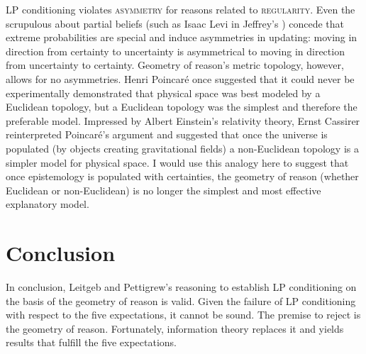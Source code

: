 \documentclass[11pt]{article}
\begin{document}
LP conditioning violates \textsc{asymmetry} for reasons related to
\textsc{regularity}. Even the scrupulous about partial beliefs (such
as Isaac Levi in Jeffrey's ) concede that extreme probabilities are special
and induce asymmetries in updating: moving in direction from certainty
to uncertainty is asymmetrical to moving in direction from uncertainty
to certainty. Geometry of reason's metric topology, however, allows
for no asymmetries. Henri Poincar{\'e} once suggested that it could
never be experimentally demonstrated that physical space was best
modeled by a Euclidean topology, but a Euclidean topology was the
simplest and therefore the preferable model. Impressed by Albert
Einstein's relativity theory, Ernst Cassirer reinterpreted
Poincar{\'e}'s argument and suggested that once the universe is
populated (by objects creating gravitational fields) a non-Euclidean
topology is a simpler model for physical space. I would use this
analogy here to suggest that once epistemology is populated with
certainties, the geometry of reason (whether Euclidean or
non-Euclidean) is no longer the simplest and most effective
explanatory model.

\section{Conclusion}
\label{ascc}

In conclusion, Leitgeb and Pettigrew's reasoning to establish LP
conditioning on the basis of the geometry of reason is valid. Given
the failure of LP conditioning with respect to the five expectations,
it cannot be sound. The premise to reject is the geometry of reason.
Fortunately, information theory replaces it and yields results that
fulfill the five expectations.


 

\end{document}
